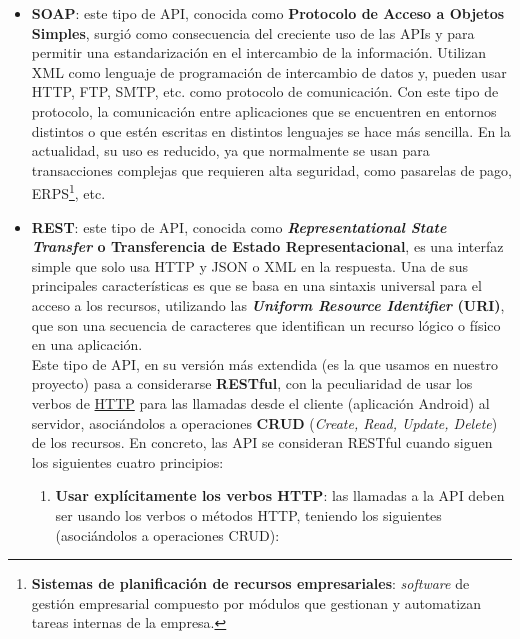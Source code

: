    \begin{itemize}
        \item \textbf{SOAP}: este tipo de API, conocida como \textbf{Protocolo de Acceso a
        Objetos Simples}, surgió como consecuencia del creciente uso de las APIs y para
        permitir una estandarización en el intercambio de la información. Utilizan XML
        como lenguaje de programación de intercambio de datos y, pueden usar HTTP,
        FTP, SMTP, etc. como protocolo de comunicación. Con este tipo de protocolo, la
        comunicación entre aplicaciones que se encuentren en entornos distintos o que estén
        escritas en distintos lenguajes se hace más sencilla. En la actualidad, su uso es
        reducido, ya que normalmente se usan para transacciones complejas que requieren
        alta seguridad, como pasarelas de pago, ERPS\footnote{\textbf{Sistemas de
        planificación de recursos empresariales}: \textit{software} de gestión empresarial
        compuesto por módulos que gestionan y automatizan tareas internas de la empresa.},
        etc.

        \item \textbf{REST}: este tipo de API, conocida como \textbf{\textit{Representational
        State Transfer} o Transferencia de Estado Representacional}, es una interfaz simple
        que solo usa HTTP y JSON o XML en la respuesta. Una de sus principales
        características es que se basa en una sintaxis universal para el acceso a los
        recursos, utilizando las \textbf{\textit{Uniform Resource Identifier} (URI)}, que
        son una secuencia de caracteres que identifican un recurso lógico o físico en una
        aplicación.\\
        
        Este tipo de API, en su versión más extendida (es la que usamos en nuestro proyecto)
        pasa a considerarse \textbf{RESTful}, con la peculiaridad de usar los verbos de
        \href{https://developer.mozilla.org/es/docs/Web/HTTP/Methods}{HTTP} para las
        llamadas desde el cliente (aplicación Android) al servidor, asociándolos a
        operaciones \textbf{CRUD} (\textit{Create, Read, Update, Delete}) de los recursos.
        En concreto, las API se consideran RESTful cuando siguen los siguientes cuatro
        principios:

            \begin{enumerate}
                \item \textbf{Usar explícitamente los verbos HTTP}: las llamadas a la API
                deben ser usando los verbos o métodos HTTP, teniendo los siguientes
                (asociándolos a operaciones CRUD):
                    

\end{enumerate}
\end{itemize}
